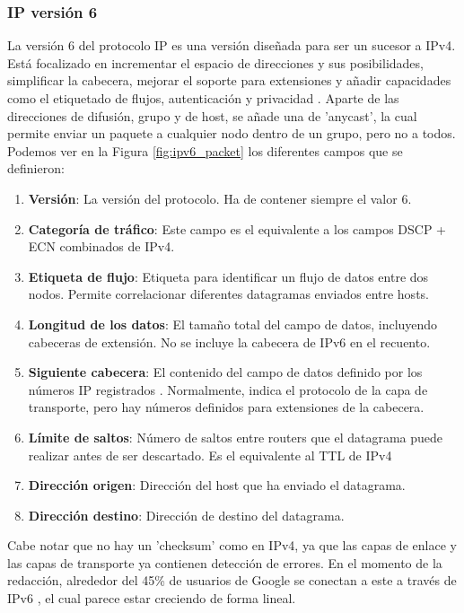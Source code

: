 \subsubsection{IP versión 6} \label{ipv6format}

La versión 6 del protocolo IP es una versión diseñada para ser un sucesor a IPv4. Está focalizado en incrementar el espacio de direcciones y sus posibilidades, simplificar la cabecera, mejorar el soporte para extensiones y añadir capacidades como el etiquetado de flujos, autenticación y privacidad \cite{rfc8200}. Aparte de las direcciones de difusión, grupo y de host, se añade una de 'anycast', la cual permite enviar un paquete a cualquier nodo dentro de un grupo, pero no a todos. Podemos ver en la Figura \ref{fig:ipv6_packet} los diferentes campos que se definieron:

\begin{enumerate}
    \item \textbf{Versión}: La versión del protocolo. Ha de contener siempre el valor 6.
    \item \textbf{Categoría de tráfico}: Este campo es el equivalente a los campos DSCP + ECN combinados de IPv4.
    \item \textbf{Etiqueta de flujo}: Etiqueta para identificar un flujo de datos entre dos nodos. Permite correlacionar diferentes datagramas enviados entre hosts.
    \item \textbf{Longitud de los datos}: El tamaño total del campo de datos, incluyendo cabeceras de extensión. No se incluye la cabecera de IPv6 en el recuento.
    \item \textbf{Siguiente cabecera}: El contenido del campo de datos definido por los números IP registrados \cite{ipprotocolnumbers}. Normalmente, indica el protocolo de la capa de transporte, pero hay números definidos para extensiones de la cabecera.
    \item \textbf{Límite de saltos}: Número de saltos entre routers que el datagrama puede realizar antes de ser descartado. Es el equivalente al TTL de IPv4
    \item \textbf{Dirección origen}: Dirección del host que ha enviado el datagrama.
    \item \textbf{Dirección destino}: Dirección de destino del datagrama.
\end{enumerate}

Cabe notar que no hay un 'checksum' como en IPv4, ya que las capas de enlace y las capas de transporte ya contienen detección de errores. En el momento de la redacción, alrededor del 45\% de usuarios de Google se conectan a este a través de IPv6 \cite{ipv4ipv6usage}, el cual parece estar creciendo de forma lineal.

